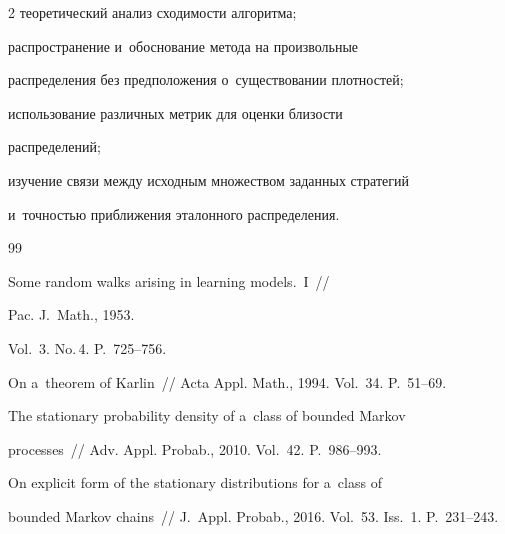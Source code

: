 \begin{multicols}{2}
теоретический анализ сходимости алгоритма;




распространение и~обоснование метода на произвольные\linebreak 


распределения без предположения о~существовании плотностей;




  использование различных мет\-рик для оценки бли\-зости 


распределений;




  изучение связи между исходным множеством заданных стратегий 


и~точ\-ностью при\-бли\-же\-ния эталонного распределения.




  


{\small\frenchspacing


 {%




 \begin{thebibliography}{99}




   Some random walks arising in learning models.~I~// 


  Pac. J.~Math., 1953. 


Vol.~3. No.\,4. P.~725--756.




   On a~theorem of Karlin~// Acta Appl. Math., 1994. Vol.~34. P.~51--69.




   The stationary probability density of a~class of bounded Markov 


processes~// Adv. Appl. Probab., 2010. Vol.~42. P.~986--993.




   On explicit form of the stationary distributions for a~class of 


bounded Markov chains~// J.~Appl. Probab., 2016. Vol.~53. Iss.~1. P.~231--243. 





\end{thebibliography}}}
\end{multicols}
